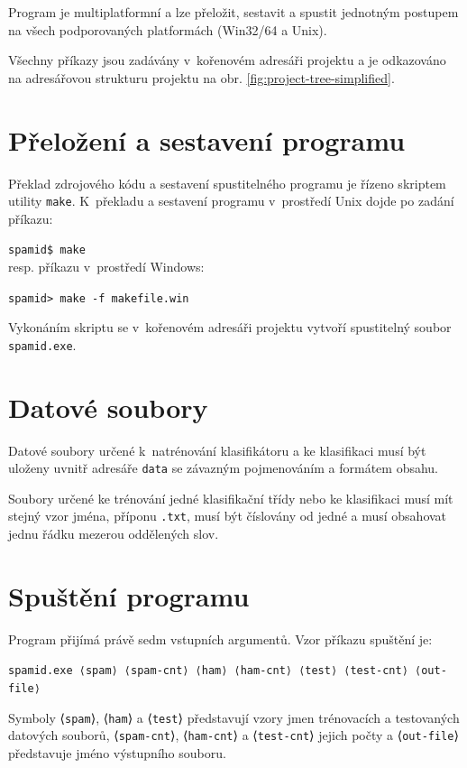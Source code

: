 \documentclass[a4paper, 12pt]{report}
\begin{document}
Program je multiplatformní a lze přeložit, sestavit a spustit jednotným 
postupem na všech podporovaných platformách (Win32/64 a Unix).

Všechny příkazy jsou zadávány v~kořenovém adresáři projektu a je 
odkazováno na adresářovou strukturu projektu na obr. 
\ref{fig:project-tree-simplified}.

\section{Přeložení a sestavení programu}

Překlad zdrojového kódu a sestavení spustitelného programu je řízeno 
skriptem utility \texttt{make}. K~překladu a sestavení programu
v~prostředí Unix dojde po zadání příkazu:

\texttt{spamid\$ make}\\
resp. příkazu v~prostředí Windows:

\texttt{spamid> make -f makefile.win}

Vykonáním skriptu se v~kořenovém adresáři projektu vytvoří spustitelný 
soubor \texttt{spamid.exe}.

\section{Datové soubory}

Datové soubory určené k~natrénování klasifikátoru a ke klasifikaci musí 
být uloženy uvnitř adresáře \texttt{data} se závazným pojmenováním a 
formátem obsahu.

Soubory určené ke trénování jedné klasifikační třídy nebo ke klasifikaci 
musí mít stejný vzor jména, příponu \texttt{.txt}, musí být číslovány od 
jedné a musí obsahovat jednu řádku mezerou oddělených slov.

\section{Spuštění programu}

Program přijímá právě sedm vstupních argumentů. Vzor příkazu spuštění je:

\texttt{spamid.exe ⟨spam⟩ ⟨spam-cnt⟩ ⟨ham⟩ ⟨ham-cnt⟩ ⟨test⟩ 
⟨test-\linebreak cnt⟩ ⟨out-file⟩}

Symboly ⟨\texttt{spam}⟩, ⟨\texttt{ham}⟩ a ⟨\texttt{test}⟩ představují 
vzory jmen trénovacích a testovaných datových souborů, 
⟨\texttt{spam-cnt}⟩, ⟨\texttt{ham-cnt}⟩ a ⟨\texttt{test-cnt}⟩ jejich počty 
a ⟨\texttt{out-file}⟩ představuje jméno výstupního souboru.
\end{document}
